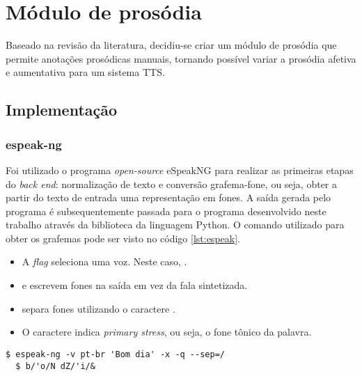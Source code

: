 
\simb[ms (milissegundos)]
\simb[Hz (Hertz)]

\chapter{Módulo de prosódia}
Baseado na revisão da literatura, decidiu-se criar um módulo de prosódia que
permite anotações prosódicas manuais, tornando possível variar a prosódia
afetiva e aumentativa para um sistema TTS.

\section{Implementação}
\subsection{espeak-ng}
Foi utilizado o programa \emph{open-source} eSpeakNG \cite{espeakng} para
realizar as primeiras etapas do \emph{back end}: normalização de texto e
conversão grafema-fone, ou seja, obter a partir do texto de entrada uma
representação em fones. A saída gerada pelo programa é subsequentemente passada
para o programa desenvolvido neste trabalho através da biblioteca
 da linguagem Python. O comando utilizado para obter os
grafemas pode ser visto no código
\ref{lst:espeak}.

\begin{itemize}
\item A \emph{flag}  seleciona uma voz. Neste caso, .
\item {} e  escrevem fones na saída em vez da fala sintetizada.
\item {} separa fones utilizando o caractere \code{/}.
\item O caractere \code{\'} indica \emph{primary stress}, ou seja, o fone tônico
da palavra.
\end{itemize}

\begin{lstlisting}[caption=Utilização do programa espeak e saída correspondente,
  label=lst:espeak]
  $ espeak-ng -v pt-br 'Bom dia' -x -q --sep=/
  $ b/'o/N dZ/'i/&
\end{lstlisting}


